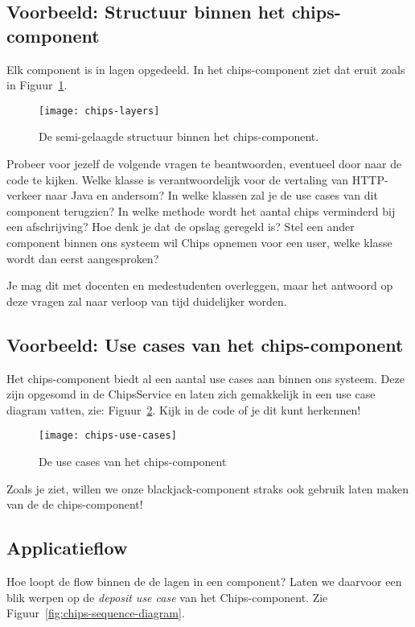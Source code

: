 \subsection{Voorbeeld: Structuur binnen het chips-component}
Elk component is in lagen opgedeeld. In het chips-component ziet 
dat eruit zoals in Figuur~\ref{fig:chips-layers}.

\begin{figure}[H]
    \centering
    \texttt{[image: chips-layers]}
    \caption{De semi-gelaagde structuur binnen het chips-component.}
    \label{fig:chips-layers}
\end{figure}

Probeer voor jezelf de volgende vragen te beantwoorden, eventueel door naar de code te kijken.
Welke klasse is verantwoordelijk voor de vertaling van HTTP-verkeer naar Java en andersom?
In welke klassen zal je de use cases van dit component terugzien?
In welke methode wordt het aantal chips verminderd bij een afschrijving?
Hoe denk je dat de opslag geregeld is?
Stel een ander component binnen ons systeem wil Chips opnemen voor een user, welke klasse wordt dan 
eerst aangesproken?

Je mag dit met docenten en medestudenten overleggen, 
maar het antwoord op deze vragen zal naar verloop van tijd duidelijker worden.

\newpage
\subsection{Voorbeeld: Use cases van het chips-component}
Het chips-component biedt al een aantal use cases aan binnen ons systeem.
Deze zijn opgesomd in de ChipsService en laten zich gemakkelijk in een 
use case diagram vatten, zie: Figuur~\ref{fig:chips-use-cases}.
Kijk in de code of je dit kunt herkennen!

\begin{figure}[H]
    \centering
    \texttt{[image: chips-use-cases]}
    \caption{De use cases van het chips-component}
    \label{fig:chips-use-cases}
\end{figure}

Zoals je ziet, willen we onze blackjack-component straks 
ook gebruik laten maken van de de chips-component!

\newpage
\subsection{Applicatieflow}
Hoe loopt de flow binnen de de lagen in een component? 
Laten we daarvoor een blik werpen 
op de \emph{deposit use case} van het Chips-component.
Zie Figuur~\ref{fig:chips-sequence-diagram}.

